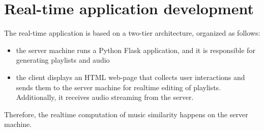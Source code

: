 \chapter{Real-time application development} 

\label{Chapter6} 


The real-time application is based on a two-tier architecture, organized as follows:
\begin{itemize}
\item the server machine runs a Python Flask application, and it is responsible for generating playlists and audio
\item the client displays an HTML web-page that collects user interactions and sends them to the server machine for realtime editing of playlists. Additionally, it receives audio streaming from the server.
\end{itemize}

Therefore, the realtime computation of music similarity happens on the server machine.

